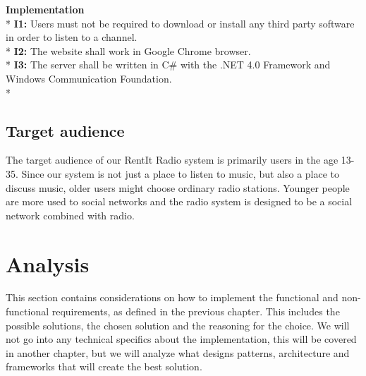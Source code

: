 \documentclass[a4paper,11pt,report]{article}
\begin{document}
{\textbf{Implementation} \\*
\textbf{I1:} Users must not be required to download or install any third party software in order to listen to a channel. \\*
\textbf{I2:} The website shall work in Google Chrome browser. \\*
\textbf{I3:} The server shall be written in C\# with the .NET 4.0 Framework and Windows Communication Foundation. \\*

\subsection{Target audience}
The target audience of our RentIt Radio system is primarily users in the age 13-35. Since our system is not just a place to listen to music, but also a place to discuss music,  older users might choose ordinary radio stations. Younger people are more used to social networks and the radio system is designed to be a social network combined with radio.

\section{Analysis}
This section contains considerations on how to implement the functional and non-functional requirements, as defined in the previous chapter. This includes the possible solutions, the chosen solution and the reasoning for the choice. We will not go into any technical specifics about the implementation, this will be covered in another chapter, but we will analyze what designs patterns, architecture and frameworks that will create the best solution. 

}
\end{document}
